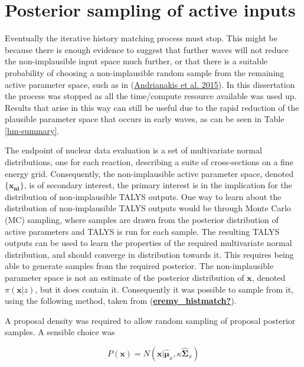 \documentclass[
  12pt,
  a4paper,
  twoside]{book}
\begin{document}
\hypertarget{posterior-sampling}{%
\section{Posterior sampling of active inputs}\label{posterior-sampling}}

Eventually the iterative history matching process must stop. This might be because there is enough evidence to suggest that further waves will not reduce the non-implausible input space much further, or that there is a suitable probability of choosing a non-implausible random sample from the remaining active parameter space, such as in (\protect\hyperlink{ref-jeremy_histmatch}{Andrianakis et al. 2015}). In this dissertation the process was stopped as all the time/compute resource available was used up. Results that arise in this way can still be useful due to the rapid reduction of the plausible parameter space that occurs in early waves, as can be seen in Table \ref{hm-summary}.

The endpoint of nuclear data evaluation is a set of multivariate normal distributions, one for each reaction, describing a suite of cross-sections on a fine energy grid. Consequently, the non-implausible active parameter space, denoted \(\{\mathbf{x_{ni}}\}\), is of secondary interest, the primary interest is in the implication for the distribution of non-implausible TALYS outputs. One way to learn about the distribution of non-implausible TALYS outputs would be through Monte Carlo (MC) sampling, where samples are drawn from the posterior distribution of active parameters and TALYS is run for each sample. The resulting TALYS outputs can be used to learn the properties of the required multivariate normal distribution, and should converge in distribution towards it. This requires being able to generate samples from the required posterior. The non-implausible parameter space is not an estimate of the posterior distribution of \(\mathbf{x}\), denoted \(\pi(\mathbf{x}|z)\), but it does contain it. Consequently it was possible to sample from it, using the following method, taken from (\protect\hyperlink{ref-eremy_histmatch}{\textbf{eremy\_histmatch?}}).

A proposal density was required to allow random sampling of proposal posterior samples. A sensible choice was

\begin{equation}
\label{eq:proposal}
P(\mathbf{x}) = N\left(\mathbf{x}|\hat{\mathbf{\mu}}_x, \kappa\hat{\mathbf{\Sigma}}_x \right)
\end{equation}
\end{document}
